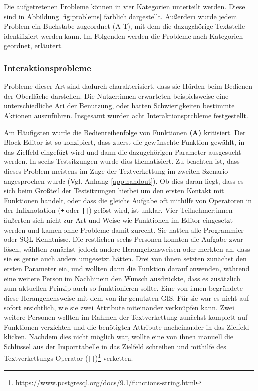 Die aufgetretenen Probleme können in vier Kategorien unterteilt werden. Diese sind in Abbildung \ref{fig:problems} farblich dargestellt. Außerdem wurde jedem Problem ein Buchstabe zugeordnet (A-T), mit dem die dazugehörige Textstelle identifiziert werden kann. Im Folgenden werden die Probleme nach Kategorien geordnet, erläutert.

\subsubsection{Interaktionsprobleme}

Probleme dieser Art sind dadurch charakterisiert, dass sie Hürden beim Bedienen der Oberfläche darstellen. Die Nutzer:innen erwarteten beispielsweise eine unterschiedliche Art der Benutzung, oder hatten Schwierigkeiten bestimmte Aktionen auszuführen. Insgesamt wurden acht Interaktionsprobleme festgestellt.

Am Häufigsten wurde die Bedienreihenfolge von Funktionen \textbf{(A)} kritisiert. Der Block-Editor ist so konzipiert, dass zuerst die gewünschte Funktion gewählt, in das Zielfeld eingefügt wird und dann die dazugehörigen Parameter ausgesucht werden. In sechs Testsitzungen wurde dies thematisiert. Zu beachten ist, dass dieses Problem meistens im Zuge der Textverkettung im zweiten Szenario angesprochen wurde (Vgl. Anhang \ref{app:handout}). Ob dies daran liegt, dass es sich beim Großteil der Testsitzungen hierbei um den ersten Kontakt mit Funktionen handelt, oder dass die gleiche Aufgabe oft mithilfe von Operatoren in der Infixnotation (\texttt{+} oder \texttt{||}) gelöst wird, ist unklar. Vier Teilnehmer:innen äußerten sich nicht zur Art und Weise wie Funktionen im Editor eingesetzt werden und kamen ohne Probleme damit zurecht. Sie hatten alle Programmier- oder \ac{SQL}-Kenntnisse. Die restlichen sechs Personen konnten die Aufgabe zwar lösen, wählten zunächst jedoch andere Herangehensweisen oder merkten an, dass sie es gerne auch anders umgesetzt hätten. Drei von ihnen setzten zunächst den ersten Parameter ein, und wollten dann die Funktion darauf anwenden, während eine weitere Person im Nachhinein den Wunsch ausdrückte, dass es zusätzlich zum aktuellen Prinzip auch so funktionieren sollte. Eine von ihnen begründete diese Herangehensweise mit dem von ihr genutzten \ac{GIS}. Für sie war es nicht auf sofort ersichtlich, wie sie zwei Attribute miteinander verknüpfen kann. Zwei weitere Personen wollten im Rahmen der Textverkettung zunächst komplett auf Funktionen verzichten und die benötigten Attribute nacheinander in das Zielfeld klicken. Nachdem dies nicht möglich war, wollte eine von ihnen manuell die Schlüssel aus der Importtabelle in das Zielfeld schreiben und mithilfe des Textverkettungs-Operator (\texttt{||})\footnote{\url{https://www.postgresql.org/docs/9.1/functions-string.html}} verketten.

